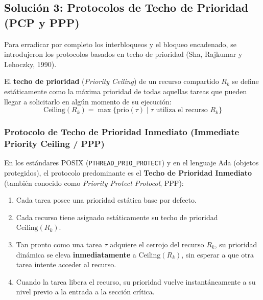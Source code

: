 \subsection{Solución 3: Protocolos de Techo de Prioridad (PCP y PPP)}
Para erradicar por completo los interbloqueos y el bloqueo encadenado, se introdujeron los protocolos basados en techo de prioridad (Sha, Rajkumar y Lehoczky, 1990).

\begin{definicion}
El \textbf{techo de prioridad} (\textit{Priority Ceiling}) de un recurso compartido $R_k$ se define estáticamente como la máxima prioridad de todas aquellas tareas que pueden llegar a solicitarlo en algún momento de su ejecución:
\begin{equation}
\text{Ceiling}(R_k) = \max \{ \text{prio}(\tau) \mid \tau \text{ utiliza el recurso } R_k \}
\end{equation}
\end{definicion}

\subsubsection{Protocolo de Techo de Prioridad Inmediato (Immediate Priority Ceiling / PPP)}
En los estándares POSIX (\texttt{PTHREAD\_PRIO\_PROTECT}) y en el lenguaje Ada (objetos protegidos), el protocolo predominante es el \textbf{Techo de Prioridad Inmediato} (también conocido como \textit{Priority Protect Protocol}, PPP):

\begin{tcolorbox}[colback=scdLightGreen,colframe=scdGreen,title=\textbf{Mecanismo del Techo de Prioridad Inmediato (PPP)},arc=3pt]
\begin{enumerate}[leftmargin=*]
    \item Cada tarea posee una prioridad estática base por defecto.
    \item Cada recurso tiene asignado estáticamente su techo de prioridad $\text{Ceiling}(R_k)$.
    \item Tan pronto como una tarea $\tau$ adquiere el cerrojo del recurso $R_k$, su prioridad dinámica se eleva \textbf{inmediatamente} a $\text{Ceiling}(R_k)$, sin esperar a que otra tarea intente acceder al recurso.
    \item Cuando la tarea libera el recurso, su prioridad vuelve instantáneamente a su nivel previo a la entrada a la sección crítica.
\end{enumerate}
\end{tcolorbox}

